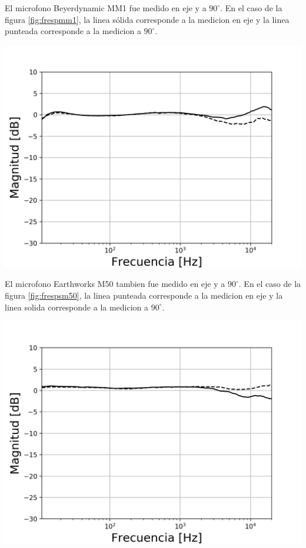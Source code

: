 \documentclass[]{article}
\makeatletter
\newenvironment{figurehere}   %
  {\def\@captype{figure}}   %
  {\par\medskip}
  {}              %
\makeatother
\begin{document}
\begin{multicols}{2}
El microfono Beyerdynamic MM1 fue medido en eje y a $90^\circ$. En el caso de
la figura \ref{fig:frespmm1}, la linea sólida corresponde a la medicion en eje y
la linea punteada corresponde a la medicion a $90^\circ$.

\begin{figurehere}
 \centering
 \includegraphics[width=\linewidth]{BEYERDYNAMIC MM1}
 \label{fig:frespmm1}
\end{figurehere}

El microfono Earthworks M50 tambien fue medido en eje y a $90^\circ$. En el caso de
la figura \ref{fig:frespsm50}, la linea punteada corresponde a la medicion en eje y
la linea solida corresponde a la medicion a $90^\circ$.

\begin{figurehere}
 \centering
 \includegraphics[width=\linewidth]{EARTHWORKS M50x2}
 \label{fig:frespsm50}
\end{figurehere}


\end{multicols}
\end{document}
